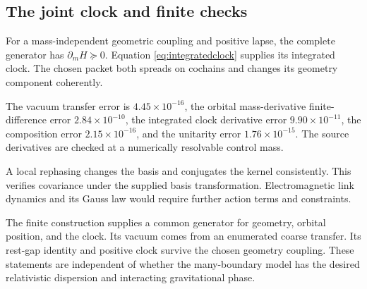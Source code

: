 \subsection{The joint clock and finite checks}

For a mass-independent geometric coupling and positive lapse, the complete generator has $\partial_mH\succeq0$. Equation \eqref{eq:integratedclock} supplies its integrated clock. The chosen packet both spreads on cochains and changes its geometry component coherently.

The vacuum transfer error is $4.45\times10^{-16}$, the orbital mass-derivative finite-difference error $2.84\times10^{-10}$, the integrated clock derivative error $9.90\times10^{-11}$, the composition error $2.15\times10^{-16}$, and the unitarity error $1.76\times10^{-15}$. The source derivatives are checked at a numerically resolvable control mass.

A local rephasing changes the basis and conjugates the kernel consistently. This verifies covariance under the supplied basis transformation. Electromagnetic link dynamics and its Gauss law would require further action terms and constraints.

The finite construction supplies a common generator for geometry, orbital position, and the clock. Its vacuum comes from an enumerated coarse transfer. Its rest-gap identity and positive clock survive the chosen geometry coupling. These statements are independent of whether the many-boundary model has the desired relativistic dispersion and interacting gravitational phase.
